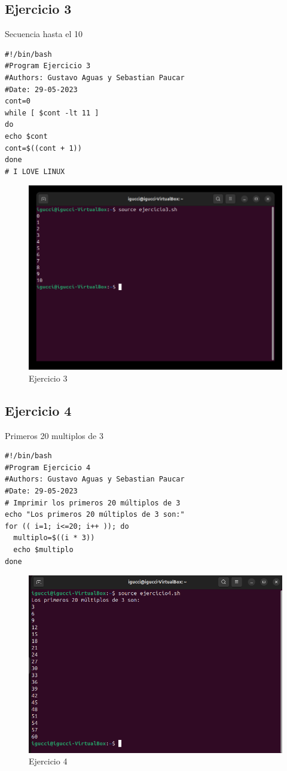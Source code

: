 \documentclass[11pt,twoside]{book}
\begin{document}
\newpage
\subsection{Ejercicio 3}

Secuencia hasta el 10
\begin{lstlisting}
#!/bin/bash
#Program Ejercicio 3
#Authors: Gustavo Aguas y Sebastian Paucar
#Date: 29-05-2023
cont=0
while [ $cont -lt 11 ]
do
echo $cont
cont=$((cont + 1))
done
# I LOVE LINUX
\end{lstlisting}
\begin{figure}[h]
    \centering
    \includegraphics[width=0.5\linewidth]{Ej3.png}
    \caption{Ejercicio 3}

\end{figure}

\newpage
\subsection{Ejercicio 4}

Primeros 20 multiplos de 3
\begin{lstlisting}
#!/bin/bash
#Program Ejercicio 4
#Authors: Gustavo Aguas y Sebastian Paucar
#Date: 29-05-2023
# Imprimir los primeros 20 múltiplos de 3
echo "Los primeros 20 múltiplos de 3 son:"
for (( i=1; i<=20; i++ )); do
  multiplo=$((i * 3))
  echo $multiplo
done

\end{lstlisting}
\begin{figure}[h]
    \centering
    \includegraphics[width=0.5\linewidth]{Ej4.png}
    \caption{Ejercicio 4}

\end{figure}
\end{document}
